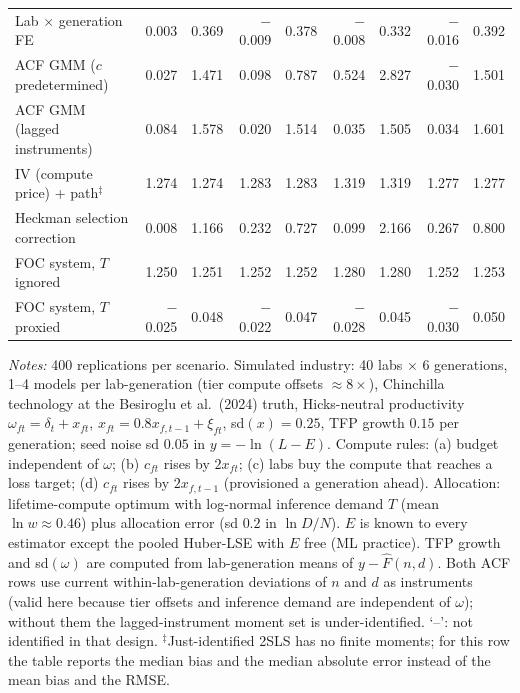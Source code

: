 \begin{table}[!htbp]
\begin{threeparttable}
\begin{tabular}{lrrrrrrrr}
Lab $\times$ generation FE & 0.003 & 0.369 & $-$0.009 & 0.378 & $-$0.008 & 0.332 & $-$0.016 & 0.392 \\
ACF GMM ($c$ predetermined) & 0.027 & 1.471 & 0.098 & 0.787 & 0.524 & 2.827 & $-$0.030 & 1.501 \\
ACF GMM (lagged instruments) & 0.084 & 1.578 & 0.020 & 1.514 & 0.035 & 1.505 & 0.034 & 1.601 \\
IV (compute price) + path$^{\ddagger}$ & 1.274 & 1.274 & 1.283 & 1.283 & 1.319 & 1.319 & 1.277 & 1.277 \\
Heckman selection correction & 0.008 & 1.166 & 0.232 & 0.727 & 0.099 & 2.166 & 0.267 & 0.800 \\
FOC system, $T$ ignored & 1.250 & 1.251 & 1.252 & 1.252 & 1.280 & 1.280 & 1.252 & 1.253 \\
FOC system, $T$ proxied & $-$0.025 & 0.048 & $-$0.022 & 0.047 & $-$0.028 & 0.045 & $-$0.030 & 0.050 \\
\bottomrule
\end{tabular}
\begin{tablenotes}[flushleft]\footnotesize
\item \textit{Notes:} 400 replications per scenario. Simulated industry: 40 labs $\times$ 6 generations, 1--4 models per lab-generation (tier compute offsets $\approx 8\times$), Chinchilla technology at the Besiroglu et al.\ (2024) truth, Hicks-neutral productivity $\omega_{ft}=\delta_t+x_{ft}$, $x_{ft}=0.8x_{f,t-1}+\xi_{ft}$, sd$(x)=0.25$, TFP growth $0.15$ per generation; seed noise sd $0.05$ in $y=-\ln(L-E)$. Compute rules: (a) budget independent of $\omega$; (b) $c_{ft}$ rises by $2x_{ft}$; (c) labs buy the compute that reaches a loss target; (d) $c_{ft}$ rises by $2x_{f,t-1}$ (provisioned a generation ahead). Allocation: lifetime-compute optimum with log-normal inference demand $T$ (mean $\ln w\approx0.46$) plus allocation error (sd $0.2$ in $\ln D/N$). $E$ is known to every estimator except the pooled Huber-LSE with $E$ free (ML practice). TFP growth and sd$(\omega)$ are computed from lab-generation means of $y-\hat F(n,d)$. Both ACF rows use current within-lab-generation deviations of $n$ and $d$ as instruments (valid here because tier offsets and inference demand are independent of $\omega$); without them the lagged-instrument moment set is under-identified. `--': not identified in that design. $^{\ddagger}$Just-identified 2SLS has no finite moments; for this row the table reports the median bias and the median absolute error instead of the mean bias and the RMSE. 
\end{tablenotes}
\end{threeparttable}
\end{table}
